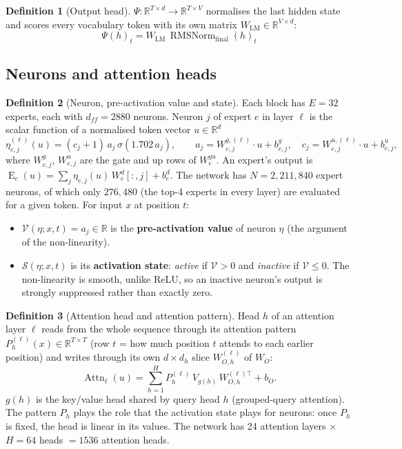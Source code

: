 \documentclass[10pt,a4paper]{article}
\newcommand{\op}[1]{\operatorname{#1}}
\theoremstyle{definition}
\newtheorem{definition}{Definition}[section]
\begin{document}
\begin{definition}[Output head]
$\Psi:\mathbb{R}^{T\times d}\to\mathbb{R}^{T\times V}$ normalises the last hidden state and scores every vocabulary token with its own matrix $W_{\mathrm{LM}}\in\mathbb{R}^{V\times d}$:
\begin{equation}
  \Psi(h)_t = W_{\mathrm{LM}}\,\op{RMSNorm}_{\mathrm{final}}(h)_t
\end{equation}
\end{definition}
\subsection{Neurons and attention heads}
\begin{definition}[Neuron, pre-activation value and state]
Each block has $E=32$ experts, each with $d_{ff}=2880$ neurons. Neuron $j$ of expert $e$ in layer $\ell$ is the scalar function of a normalised token vector $u\in\mathbb{R}^{d}$
\begin{equation}
  \eta^{(\ell)}_{e,j}(u) = (c_j+1)\,a_j\,\sigma(1.702\,a_j),\qquad a_j = W^{g,(\ell)}_{e,j}\cdot u + b^{g}_{e,j},\quad c_j = W^{u,(\ell)}_{e,j}\cdot u + b^{u}_{e,j},
\end{equation}
where $W^{g}_{e,j}$, $W^{u}_{e,j}$ are the gate and up rows of $W^{gu}_e$. An expert's output is $\op{E}_e(u)=\sum_j \eta_{e,j}(u)\,W^{d}_{e}[:,j]+b^{d}_e$. The network has $N=2{,}211{,}840$ expert neurons, of which only $276{,}480$ (the top-4 experts in every layer) are evaluated for a given token. For input $x$ at position $t$:
\begin{itemize}
\item $\mathcal{V}(\eta;x,t)=a_j\in\mathbb{R}$ is the \textbf{pre-activation value} of neuron $\eta$ (the argument of the non-linearity).
\item $\mathcal{S}(\eta;x,t)$ is its \textbf{activation state}: \emph{active} if $\mathcal{V}>0$ and \emph{inactive} if $\mathcal{V}\le 0$. The non-linearity is smooth, unlike ReLU, so an inactive neuron's output is strongly suppressed rather than exactly zero.
\end{itemize}
\end{definition}
\begin{definition}[Attention head and attention pattern]
Head $h$ of an attention layer $\ell$ reads from the whole sequence through its attention pattern $P^{(\ell)}_h(x)\in\mathbb{R}^{T\times T}$ (row $t$ = how much position $t$ attends to each earlier position) and writes through its own $d\times d_h$ slice $W^{(\ell)}_{O,h}$ of $W_O$:
\begin{equation}
  \op{Attn}_\ell(u) = \sum_{h=1}^{H} P^{(\ell)}_h\,V_{g(h)}\,W^{(\ell)\top}_{O,h} + b_O.
\end{equation}
$g(h)$ is the key/value head shared by query head $h$ (grouped-query attention). The pattern $P_h$ plays the role that the activation state plays for neurons: once $P_h$ is fixed, the head is linear in its values. The network has 24 attention layers $\times$ $H=64$ heads $=1536$ attention heads.
\end{definition}
\end{document}
